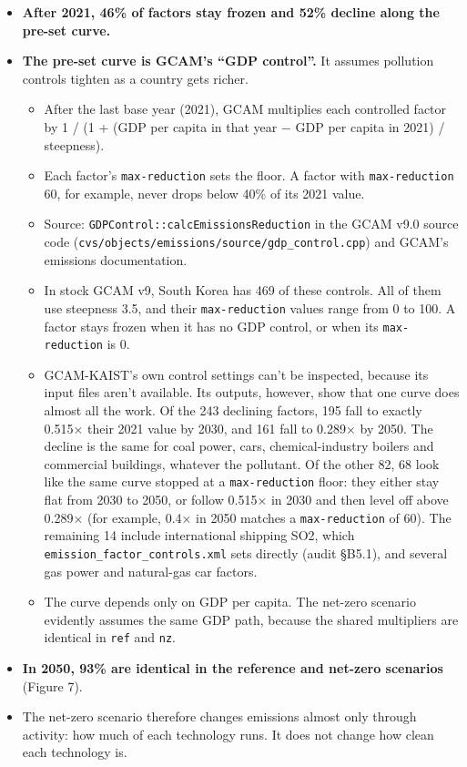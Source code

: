 \begin{itemize}
\tightlist
\item
  \textbf{After
  2021,
  46\% of
  factors
  stay
  frozen
  and 52\%
  decline
  along
  the
  pre-set
  curve.}
\item
  \textbf{The pre-set curve is GCAM's ``GDP control''.} It assumes pollution
  controls tighten as a country gets richer.

  \begin{itemize}
  \tightlist
  \item
    After the last base year (2021), GCAM multiplies each controlled factor
    by 1 / (1 + (GDP per capita in that year $-$ GDP per capita in 2021) /
    steepness).
  \item
    Each factor's \texttt{max-reduction} sets the floor. A factor with
    \texttt{max-reduction} 60, for example, never drops below 40\% of its 2021
    value.
  \item
    Source: \texttt{GDPControl::calcEmissionsReduction} in the GCAM v9.0
    source code
    (\texttt{cvs/\allowbreak{}objects/\allowbreak{}emissions/\allowbreak{}source/\allowbreak{}gdp\_\allowbreak{}control.\allowbreak{}cpp})
    and GCAM's emissions documentation.
  \item
    In stock GCAM v9, South Korea has 469 of these controls. All of them use
    steepness 3.5, and their \texttt{max-reduction} values range from 0 to
    100. A factor stays frozen when it has no GDP control, or when its
    \texttt{max-reduction} is 0.
  \item
    GCAM-KAIST's own control settings can't be inspected, because its input
    files aren't available. Its outputs, however, show that one curve does
    almost all the work. Of the 243 declining factors, 195 fall to exactly
    0.515× their 2021 value by 2030, and 161 fall to 0.289× by 2050. The
    decline is the same for coal power, cars, chemical-industry boilers and
    commercial buildings, whatever the pollutant. Of the other 82, 68 look
    like the same curve stopped at a \texttt{max-reduction} floor: they either
    stay flat from 2030 to 2050, or follow 0.515× in 2030 and then level off
    above 0.289× (for example, 0.4× in 2050 matches a \texttt{max-reduction}
    of 60). The remaining 14 include international shipping SO2, which
    \texttt{emission\_factor\_controls.xml} sets directly (audit §B5.1), and
    several gas power and natural-gas car factors.
  \item
    The curve depends only on GDP per capita. The net-zero scenario evidently
    assumes the same GDP path, because the shared multipliers are identical
    in \texttt{ref} and \texttt{nz}.
  \end{itemize}
\item
  \textbf{In 2050, 93\% are
  identical
  in the
  reference
  and
  net-zero
  scenarios}
  (Figure
  7).
\item
  The
  net-zero
  scenario
  therefore
  changes
  emissions
  almost
  only
  through
  activity:
  how much
  of each
  technology
  runs. It
  does not
  change
  how
  clean
  each
  technology
  is.
\end{itemize}

